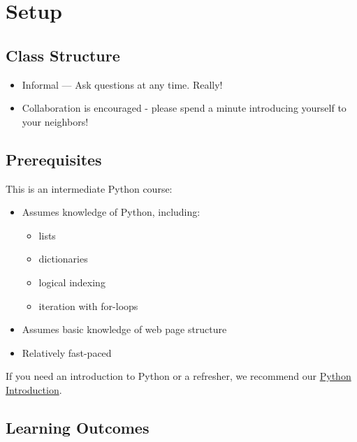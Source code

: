 \documentclass[]{book}
\providecommand{\tightlist}{%
  \setlength{\itemsep}{0pt}\setlength{\parskip}{0pt}}
\begin{document}
\hypertarget{setup-5}{%
\section{Setup}\label{setup-5}}

\hypertarget{class-structure-5}{%
\subsection{Class Structure}\label{class-structure-5}}

\begin{itemize}
\tightlist
\item
  Informal --- Ask questions at any time. Really!
\item
  Collaboration is encouraged - please spend a minute introducing yourself to your neighbors!
\end{itemize}

\hypertarget{prerequisites-5}{%
\subsection{Prerequisites}\label{prerequisites-5}}

This is an intermediate Python course:

\begin{itemize}
\tightlist
\item
  Assumes knowledge of Python, including:

  \begin{itemize}
  \tightlist
  \item
    lists
  \item
    dictionaries
  \item
    logical indexing
  \item
    iteration with for-loops
  \end{itemize}
\item
  Assumes basic knowledge of web page structure
\item
  Relatively fast-paced
\end{itemize}

If you need an introduction to Python or a refresher, we recommend our
\href{https://iqss.github.io/dss-workshops/PythonIntro.html}{Python Introduction}.

\hypertarget{learning-outcomes}{%
\subsection{Learning Outcomes}\label{learning-outcomes}}
\end{document}
